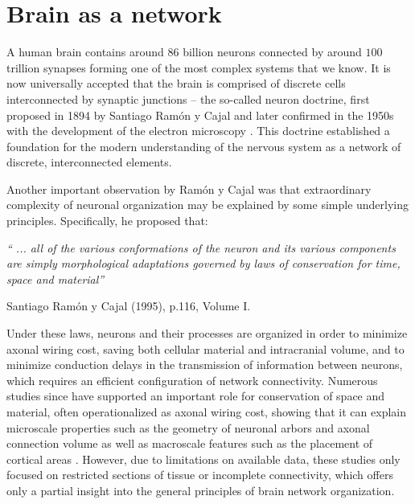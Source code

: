 \section{Brain as a network}
A human brain contains around $86$ billion neurons connected by around $100$ trillion synapses \citep{Williams1988,Andersen1992,Pelvig2008} forming one of the most complex systems that we know. It is now universally accepted that the brain is comprised of discrete cells interconnected by synaptic junctions -- the so-called neuron doctrine, first proposed in 1894 by Santiago Ram\'{o}n y Cajal \citep{RamonyCajal1995} and later confirmed in the 1950s with the development of the electron microscopy \citep{DeRobertis1955}. This doctrine established a foundation for the modern understanding of the nervous system as a network of discrete, interconnected elements.

Another important observation by Ram\'{o}n y Cajal was that extraordinary complexity of neuronal organization may be explained by some simple underlying principles. Specifically, he proposed that:
\bigskip
\bigskip

\textit{`` ... all of the various conformations of the neuron and its various components are simply morphological adaptations governed by laws of conservation for time, space and material''}

\hspace{7.5cm}Santiago Ram\'{o}n y Cajal (1995), p.116, Volume I.
\bigskip
\bigskip

Under these laws, neurons and their processes are organized in order to minimize axonal wiring cost, saving both cellular material and intracranial volume, and to minimize conduction delays in the transmission of information between neurons, which requires an efficient configuration of network connectivity. Numerous studies since have supported an important role for conservation of space and material, often operationalized as axonal wiring cost, showing that it can explain microscale properties such as the geometry of neuronal arbors \citep{Cherniak1999} and axonal connection volume \citep{Chklovskii2002} as well as macroscale features such as the placement of cortical areas \citep{Cherniak2004}. However, due to limitations on available data, these studies only focused on restricted sections of tissue or incomplete connectivity, which offers only a partial insight into the general principles of brain network organization.

